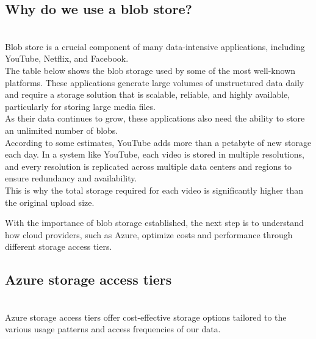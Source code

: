 \subsection{Why do we use a blob store?}\label{why-do-we-use-a-blob-store}
\\
Blob store is a crucial component of many data-intensive applications, including YouTube, Netflix, and Facebook.
\\
The table below shows the blob storage used by some of the most well-known platforms. These applications generate large volumes of unstructured data daily and require a storage solution that is scalable, reliable, and highly available, particularly for storing large media files.
\\
As their data continues to grow, these applications also need the ability to store an unlimited number of blobs.
\\
According to some estimates, YouTube adds more than a petabyte of new storage each day. In a system like YouTube, each video is stored in multiple resolutions, and every resolution is replicated across multiple data centers and regions to ensure redundancy and availability.
\\
This is why the total storage required for each video is significantly higher than the original upload size.

\begin{table}[htbp]
\centering
\small
{}
\end{table}

With the importance of blob storage established, the next step is to understand how cloud providers, such as Azure, optimize costs and performance through different storage access tiers.

\subsection{Azure storage access tiers}\label{rdv4DttQETC0pGQZ_NyFm}
\\
Azure storage access tiers offer cost-effective storage options tailored to the various usage patterns and access frequencies of our data.


